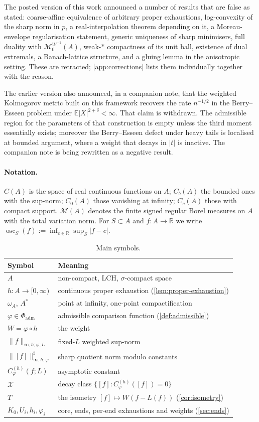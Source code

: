 \documentclass[11pt,a4paper]{article}
\numberwithin{equation}{section}
\theoremstyle{plain}
\theoremstyle{definition}
\theoremstyle{remark}
\newcommand{\R}{\mathbb{R}}
\newcommand{\wA}{\omega_A}
\newcommand{\Astar}{A^{\ast}}
\newcommand{\Cb}{C_b}
\newcommand{\Cz}{C_0}
\newcommand{\Msp}{\mathcal{M}}
\newcommand{\Xdec}{\mathcal{X}}
\DeclareMathOperator{\osc}{osc}
\begin{document}
The posted version of this work announced a number of results that are false as stated:
coarse-affine equivalence of arbitrary proper exhaustions, log-convexity of the sharp norm
in $p$, a real-interpolation theorem depending on it, a Moreau-envelope regularisation
statement, generic uniqueness of sharp minimisers, full duality with
$\Msp_0^{W^{-1}}(A)$, weak-$*$ compactness of its unit ball, existence of dual extremals,
a Banach-lattice structure, and a gluing lemma in the anisotropic setting. These are
retracted; \cref{app:corrections} lists them individually together with the reason.

The earlier version also announced, in a companion note, that the weighted Kolmogorov
metric built on this framework recovers the rate $n^{-1/2}$ in the Berry--Esseen problem
under $\mathbb{E}|X|^{2+\delta}<\infty$. That claim is withdrawn. The admissible region
for the parameters of that construction is empty unless the third moment essentially
exists; moreover the Berry--Esseen defect under heavy tails is localised at bounded
argument, where a weight that decays in $|t|$ is inactive. The companion note is being
rewritten as a negative result.

\paragraph{Notation.} $C(A)$ is the space of real continuous functions on $A$;
$\Cb(A)$ the bounded ones with the sup-norm; $\Cz(A)$ those vanishing at infinity;
$C_c(A)$ those with compact support. $\Msp(A)$ denotes the finite signed regular Borel
measures on $A$ with the total variation norm. For $S\subset A$ and $f:A\to\R$ we write
$\osc_S(f):=\inf_{c\in\R}\sup_{S}|f-c|$.

\begin{table}[ht]
\centering
\caption{Main symbols.}
\begin{tabular}{l l}
\hline
Symbol & Meaning \\
\hline
$A$ & non-compact, LCH, $\sigma$-compact space \\
$h:A\to[0,\infty)$ & continuous proper exhaustion (\cref{lem:proper-exhaustion}) \\
$\wA$, $\Astar$ & point at infinity, one-point compactification \\
$\varphi\in\Phi_{\mathrm{adm}}$ & admissible comparison function (\cref{def:admissible}) \\
$W=\varphi\circ h$ & the weight \\
$\|f\|_{\infty,h;\varphi;L}$ & fixed-$L$ weighted sup-norm \\
$\|[f]\|^{\sharp}_{\infty,h;\varphi}$ & sharp quotient norm modulo constants \\
$C^{(h)}_{\varphi}(f;L)$ & asymptotic constant \\
$\Xdec$ & decay class $\{[f]:C^{(h)}_{\varphi}([f])=0\}$ \\
$T$ & the isometry $[f]\mapsto W(f-L(f))$ (\cref{cor:isometry}) \\
$K_0,U_i,h_i,\varphi_i$ & core, ends, per-end exhaustions and weights (\cref{sec:ends}) \\
\hline
\end{tabular}
\end{table}
\end{document}
